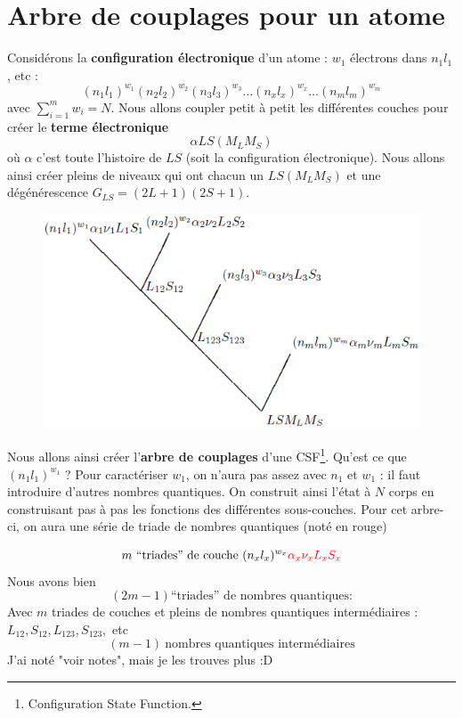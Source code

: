\section{Arbre de couplages pour un atome}
Considérons la \textbf{configuration électronique} d'un atome : $w_1$ électrons dans $n_1l_1$, 
etc : 
\begin{equation}
(n_1 l_1) ^{w_1} (n_2 l_2) ^{w_2} (n_3 l_3) ^{w_3}
\ldots
(n_x l_x) ^{w_x}  \ldots (n_m l_m) ^{w_m}
\end{equation}
avec $\sum_{i=1}^m w_i = N$. Nous allons coupler petit à petit les différentes couches
pour créer le \textbf{terme électronique}
\begin{equation}
\alpha  L S (M_L M_S)
\end{equation}
où $\alpha$ c'est toute l'histoire de $LS$ (soit la configuration électronique). Nous allons
ainsi créer pleins de niveaux qui ont chacun un $LS(M_LM_S)$ et une dégénérescence $G_{LS} = 
(2L+1)(2S+1)$.\\
\newpage

	\begin{figure}
	\includegraphics[scale=0.6]{ch1/image16}
	\end{figure}
Nous allons ainsi créer l'\textbf{arbre de couplages} d'une CSF\footnote{Configuration State 
Function.}. Qu'est ce que $(n_1l_1)^{w_1}$ ? Pour caractériser $w_1$, on n'aura pas assez avec
$n_1$ et $w_1$ : il faut introduire d'autres nombres quantiques. On construit ainsi l'état à 
$N$ corps en construisant pas à pas les fonctions des différentes sous-couches. Pour cet arbre-ci,
on aura une série de triade de nombres quantiques (noté en rouge)

\begin{equation}
 m~ \mbox{``triades'' de couche}~
(n_x l_x) ^{w_x}  {\color{red} \alpha_x \nu_x L_x S_x }
\end{equation}
Nous avons bien
\begin{equation}
(2m-1) \mbox{``triades'' de nombres quantiques:}
\end{equation}
Avec $m$ triades  de couches et pleins de nombres quantiques intermédiaires : $L_{12}, S_{12}, 
L_{123}, S_{123},$ etc
\begin{equation}
(m-1)~ \mbox{nombres quantiques interm\'ediaires}
\end{equation}
J'ai noté "voir notes", mais je les trouves plus :D 

